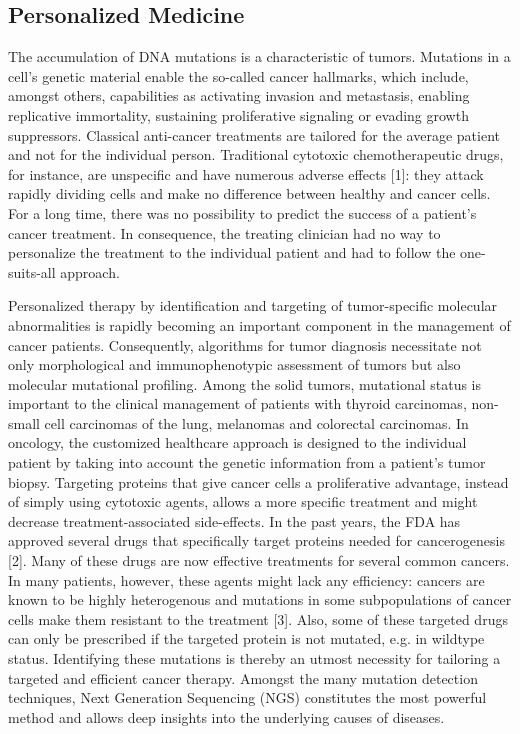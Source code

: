 \subsection{Personalized Medicine}

The accumulation of DNA mutations is a characteristic of tumors. Mutations in a
cell’s genetic material enable the so-called cancer hallmarks, which include,
amongst others, capabilities as activating invasion and metastasis, enabling
replicative immortality, sustaining proliferative signaling or evading growth
suppressors. Classical anti-cancer treatments are tailored for the \„average
patient\“ and not for the individual person. Traditional cytotoxic
chemotherapeutic drugs, for instance, are unspecific and have numerous adverse
effects [1]: they attack rapidly dividing cells and make no difference between
healthy and cancer cells. For a long time, there was no possibility to predict
the success of a patient’s cancer treatment. In consequence, the treating
clinician had no way to personalize the treatment to the individual patient and
had to follow the one-suits-all approach.

Personalized therapy by identification and targeting of tumor-specific molecular
abnormalities is rapidly becoming an important component in the management of
cancer patients. Consequently, algorithms for tumor diagnosis necessitate not
only morphological and immunophenotypic assessment of tumors but also molecular
mutational profiling. Among the solid tumors, mutational status is important to
the clinical management of patients with thyroid carcinomas, non-small cell
carcinomas of the lung, melanomas and colorectal carcinomas. In oncology, the
customized healthcare approach is designed to the individual patient by taking
into account the genetic information from a patient’s tumor biopsy. Targeting
proteins that give cancer cells a proliferative advantage, instead of simply
using cytotoxic agents, allows a more specific treatment and might decrease
treatment-associated side-effects. In the past years, the FDA has approved
several drugs that specifically target proteins needed for cancerogenesis [2].
Many of these drugs are now effective treatments for several common cancers. In
many patients, however, these agents might lack any efficiency: cancers are
known to be highly heterogenous and mutations in some subpopulations of cancer
cells make them resistant to the treatment [3]. Also, some of these targeted
drugs can only be prescribed if the targeted protein is not mutated, e.g. in
wildtype status. Identifying these mutations is thereby an utmost necessity for
tailoring a targeted and efficient cancer therapy. Amongst the many mutation
detection techniques, Next Generation Sequencing (NGS) constitutes the most
powerful method and allows deep insights into the underlying causes of diseases.

